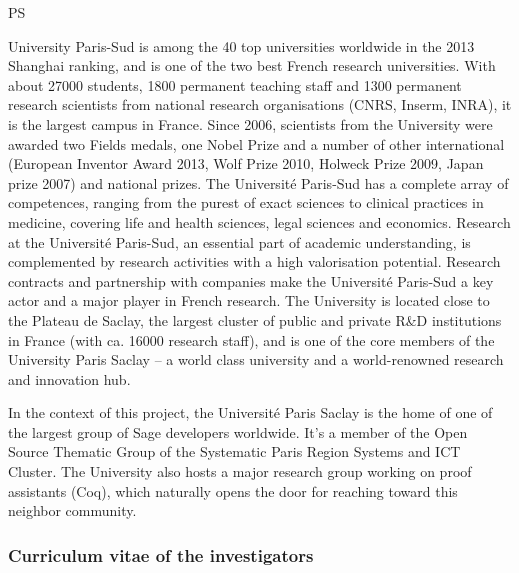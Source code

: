 \begin {sitedescription}{PS}

University Paris-Sud is among the 40 top universities worldwide in the
2013 Shanghai ranking, and is one of the two best French research
universities. With about 27000 students, 1800 permanent teaching staff
and 1300 permanent research scientists from national research
organisations (CNRS, Inserm, INRA), it is the largest campus in
France. Since 2006, scientists from the University were awarded two
Fields medals, one Nobel Prize and a number of other international
(European Inventor Award 2013, Wolf Prize 2010, Holweck Prize 2009,
Japan prize 2007) and national prizes.  The Université Paris-Sud has a
complete array of competences, ranging from the purest of exact
sciences to clinical practices in medicine, covering life and health
sciences, legal sciences and economics. Research at the Université
Paris-Sud, an essential part of academic understanding, is
complemented by research activities with a high valorisation
potential. Research contracts and partnership with companies make the
Université Paris-Sud a key actor and a major player in French
research.  The University is located close to the Plateau de Saclay,
the largest cluster of public and private R\&D institutions in France
(with ca. 16000 research staff), and is one of the core members of the
University Paris Saclay – a world class university and a
world-renowned research and innovation hub.

In the context of this project, the Université Paris Saclay is the
home of one of the largest group of Sage developers worldwide. It's a
member of the Open Source Thematic Group of the Systematic Paris
Region Systems and ICT Cluster. The University also hosts a major
research group working on proof assistants (Coq), which naturally
opens the door for reaching toward this neighbor community.


\subsubsection*{Curriculum vitae of the investigators}

%

%




\end{sitedescription}
